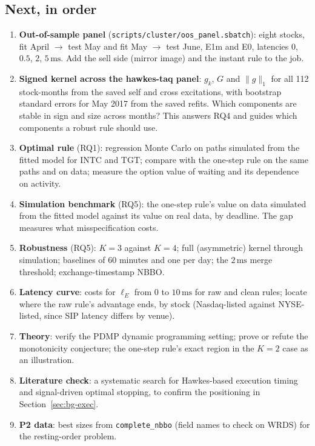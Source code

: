 \documentclass[11pt]{article}
\theoremstyle{definition}
\theoremstyle{remark}
\newcommand{\Eo}{\textsf{E0}}
\newcommand{\Em}{\textsf{E1m}}
\newcommand{\ms}{\,\text{ms}}
\newcommand{\file}[1]{\texttt{#1}}
\begin{document}
\subsection{Next, in order}
\begin{enumerate}[label=\arabic*.]
\item \textbf{Out-of-sample panel} (\file{scripts/cluster/oos\_panel.sbatch}): eight stocks, fit April $\to$ test May and fit May $\to$ test June, \Em{} and \Eo, latencies $0$, $0.5$, $2$, $5\ms$. Add the sell side (mirror image) and the instant rule to the job.
\item \textbf{Signed kernel across the hawkes-taq panel}: $g_k$, $G$ and $\|g\|_1$ for all 112 stock-months from the saved self and cross excitations, with bootstrap standard errors for May 2017 from the saved refits. Which components are stable in sign and size across months? This answers RQ4 and guides which components a robust rule should use.
\item \textbf{Optimal rule} (RQ1): regression Monte Carlo on paths simulated from the fitted model for INTC and TGT; compare with the one-step rule on the same paths and on data; measure the option value of waiting and its dependence on activity.
\item \textbf{Simulation benchmark} (RQ5): the one-step rule's value on data simulated from the fitted model against its value on real data, by deadline. The gap measures what misspecification costs.
\item \textbf{Robustness} (RQ5): $K = 3$ against $K = 4$; full (asymmetric) kernel through simulation; baselines of 60 minutes and one per day; the $2\ms$ merge threshold; exchange-timestamp NBBO.
\item \textbf{Latency curve}: costs for $\ell_E$ from $0$ to $10\ms$ for raw and clean rules; locate where the raw rule's advantage ends, by stock (Nasdaq-listed against NYSE-listed, since SIP latency differs by venue).
\item \textbf{Theory}: verify the PDMP dynamic programming setting; prove or refute the monotonicity conjecture; the one-step rule's exact region in the $K = 2$ case as an illustration.
\item \textbf{Literature check}: a systematic search for Hawkes-based execution timing and signal-driven optimal stopping, to confirm the positioning in Section~\ref{sec:bg-exec}.
\item \textbf{P2 data}: best sizes from \file{complete\_nbbo} (field names to check on WRDS) for the resting-order problem.
\end{enumerate}
\end{document}
